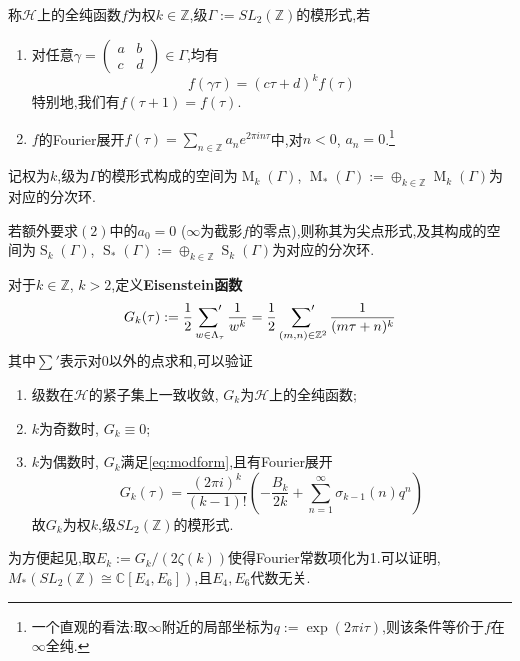 \begin{defn}
	称$\mathcal{H}$上的全纯函数$f$为权$k \in \mathbb{Z}$,级$\Gamma:= SL_2(\mathbb{Z})$的模形式,若
	
	\begin{enumerate}[(1)]
		\item 对任意$\gamma=\begin{pmatrix}
		a & b\\
		c & d
		\end{pmatrix}\in \Gamma$,均有
		\begin{equation}\label{eq:modform}
		f(\gamma \tau)=(c \tau +d)^k f(\tau)
		\end{equation}
		特别地,我们有$f(\tau+1)=f(\tau)$.
		\item $f$的Fourier展开$f(\tau)=\sum_{n \in \mathbb{Z}}a_ne^{2\pi i n \tau}$中,对$n < 0$, $a_n =0$.\footnote{一个直观的看法:取$\infty$附近的局部坐标为$q:=\exp(2\pi i \tau)$,则该条件等价于$f$在$\infty$全纯.}
	\end{enumerate}
	记权为$k$,级为$\Gamma$的模形式构成的空间为$\operatorname{M}_k(\Gamma)$, $\operatorname{M}_{*}(\Gamma):= \oplus_{k \in \mathbb{Z}}\operatorname{M}_k(\Gamma)$为对应的分次环.
	
	若额外要求$(2)$中的$a_0=0$ ($\infty$为截影$f$的零点),则称其为尖点形式,及其构成的空间为$\operatorname{S}_k(\Gamma)$, $\operatorname{S}_{*}(\Gamma):= \oplus_{k \in \mathbb{Z}}\operatorname{S}_k(\Gamma)$为对应的分次环.
\end{defn}

\begin{exercise}
	对于$k \in \mathbb{Z}$, $k>2$,定义\textbf{Eisenstein函数}
	$$G_k(\tau):= \frac{1}{2}\mathop{\mathord{\sum}'}_{w \in \Lambda_{\tau}} \frac{1}{w^k}=\frac{1}{2} \mathop{\mathord{\sum}'}_{(m,n) \in \mathbb{Z}^2} \frac{1}{(m\tau +n)^k}$$
	其中$\sum'$表示对0以外的点求和,可以验证
	\begin{enumerate}
		\item 级数在$\mathcal{H}$的紧子集上一致收敛, $G_k$为$\mathcal{H}$上的全纯函数;
		\item $k$为奇数时, $G_k \equiv 0$;
		\item $k$为偶数时, $G_k$满足\eqref{eq:modform},且有Fourier展开
		$$G_k(\tau)=\frac{(2\pi i)^k}{(k-1)!} \left( -\frac{B_k}{2k}+\sum_{n=1}^{\infty}\sigma_{k-1}(n)q^n \right)$$
		故$G_k$为权$k$,级$SL_2(\mathbb{Z})$的模形式.
	\end{enumerate}
\end{exercise}

为方便起见,取$E_k:= G_k/(2\zeta(k))$使得Fourier常数项化为1.可以证明, $M_{*}(SL_2(\mathbb{Z}) \cong \mathbb{C}[E_4,E_6])$,且$E_4,E_6$代数无关.

